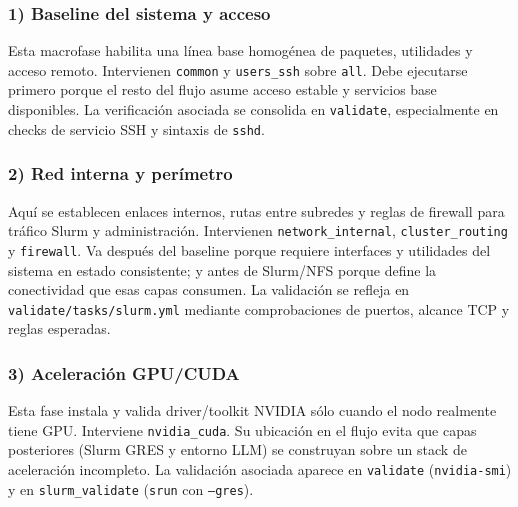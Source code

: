 \begin{center}
\end{center}

\subsubsection*{1) Baseline del sistema y acceso}
Esta macrofase habilita una línea base homogénea de paquetes, utilidades y acceso remoto. Intervienen \texttt{common} y \texttt{users\_ssh} sobre \texttt{all}. Debe ejecutarse primero porque el resto del flujo asume acceso estable y servicios base disponibles. La verificación asociada se consolida en \texttt{validate}, especialmente en checks de servicio SSH y sintaxis de \texttt{sshd}.

\subsubsection*{2) Red interna y perímetro}
Aquí se establecen enlaces internos, rutas entre subredes y reglas de firewall para tráfico Slurm y administración. Intervienen \texttt{network\_internal}, \texttt{cluster\_routing} y \texttt{firewall}. Va después del baseline porque requiere interfaces y utilidades del sistema en estado consistente; y antes de Slurm/NFS porque define la conectividad que esas capas consumen. La validación se refleja en \texttt{validate/tasks/slurm.yml} mediante comprobaciones de puertos, alcance TCP y reglas esperadas.

\subsubsection*{3) Aceleración GPU/CUDA}
Esta fase instala y valida driver/toolkit NVIDIA sólo cuando el nodo realmente tiene GPU. Interviene \texttt{nvidia\_cuda}. Su ubicación en el flujo evita que capas posteriores (Slurm GRES y entorno LLM) se construyan sobre un stack de aceleración incompleto. La validación asociada aparece en \texttt{validate} (\texttt{nvidia-smi}) y en \texttt{slurm\_validate} (\texttt{srun} con \texttt{--gres}).

